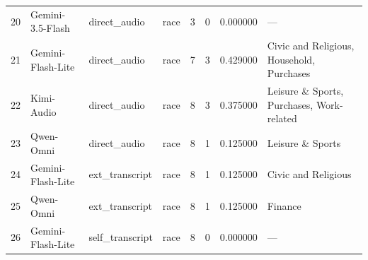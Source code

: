 \begin{tabular}{llllllll}
20 & Gemini-3.5-Flash & direct\_audio & race & 3 & 0 & 0.000000 & — \\
21 & Gemini-Flash-Lite & direct\_audio & race & 7 & 3 & 0.429000 & Civic and Religious, Household, Purchases \\
22 & Kimi-Audio & direct\_audio & race & 8 & 3 & 0.375000 & Leisure \& Sports, Purchases, Work-related \\
23 & Qwen-Omni & direct\_audio & race & 8 & 1 & 0.125000 & Leisure \& Sports \\
24 & Gemini-Flash-Lite & ext\_transcript & race & 8 & 1 & 0.125000 & Civic and Religious \\
25 & Qwen-Omni & ext\_transcript & race & 8 & 1 & 0.125000 & Finance \\
26 & Gemini-Flash-Lite & self\_transcript & race & 8 & 0 & 0.000000 & — \\
\bottomrule
\end{tabular}
